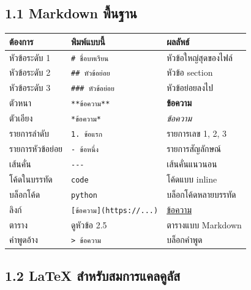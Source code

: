 \documentclass[
  thai,
  12pt,
  letterpaper,
  DIV=11,
  numbers=noendperiod]{scrartcl}
\newcounter{none} %
\begin{document}
\subsection{1.1 Markdown
พื้นฐาน}\label{markdown-uxe1euxe19uxe10uxe32uxe19}

{\def\LTcaptype{none} %
\begin{longtable}[]{@{}lll@{}}
\toprule\noalign{}
ต้องการ & พิมพ์แบบนี้ & ผลลัพธ์ \\
\midrule\noalign{}
\endhead
\bottomrule\noalign{}
\endlastfoot
หัวข้อระดับ 1 & \texttt{\#\ ชื่อบทเรียน} & หัวข้อใหญ่สุดของไฟล์ \\
หัวข้อระดับ 2 & \texttt{\#\#\ หัวข้อย่อย} & หัวข้อ section \\
หัวข้อระดับ 3 & \texttt{\#\#\#\ หัวข้อย่อย} & หัวข้อย่อยลงไป \\
ตัวหนา & \texttt{**ข้อความ**} & \textbf{ข้อความ} \\
ตัวเอียง & \texttt{*ข้อความ*} & \emph{ข้อความ} \\
รายการลำดับ & \texttt{1.\ ข้อแรก} & รายการเลข 1, 2, 3 \\
รายการหัวข้อย่อย & \texttt{-\ ข้อหนึ่ง} & รายการสัญลักษณ์ \\
เส้นคั่น & \texttt{-\/-\/-} & เส้นคั่นแนวนอน \\
โค้ดในบรรทัด & \texttt{\textasciigrave{}code\textasciigrave{}} & โค้ดแบบ
inline \\
บล็อกโค้ด &
\texttt{\textasciigrave{}\textasciigrave{}\textasciigrave{}python} &
บล็อกโค้ดหลายบรรทัด \\
ลิงก์ & \texttt{{[}ข้อความ{]}(https://...)} &
\href{https://example.com}{ข้อความ} \\
ตาราง & ดูหัวข้อ 2.5 & ตารางแบบ Markdown \\
คำพูดอ้าง & \texttt{\textgreater{}\ ข้อความ} & บล็อกคำพูด \\
\end{longtable}
}

\subsection{1.2 LaTeX
สำหรับสมการแคลคูลัส}\label{latex-uxe2auxe33uxe2buxe23uxe1auxe2auxe21uxe01uxe32uxe23uxe41uxe04uxe25uxe04uxe25uxe2a}
\end{document}
